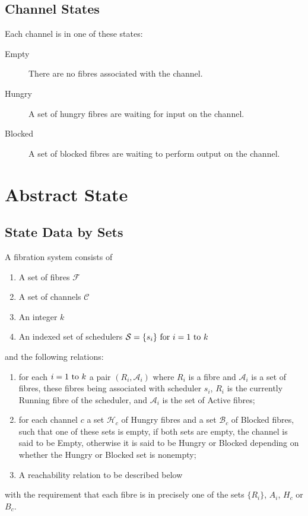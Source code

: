 \documentclass[oneside]{book}
\begin{document}
\subsection{Channel States}
Each channel is in one of these states:
\begin{description}
\item[Empty] There are no fibres associated with the channel.
\item[Hungry] A set of hungry fibres are waiting for input on the channel.
\item[Blocked] A set of blocked fibres are waiting to perform output on the channel.
\end{description}


\section{Abstract State}
\subsection{State Data by Sets}
A fibration system consists of 
\begin{enumerate}
\item A set of fibres $\mathcal F$
\item A set of channels $\mathcal C$
\item An integer $k$
\item An indexed set of schedulers $\mathcal S= \{s_i\}{\rm\ for\ }i=1 {\rm\ to\ }k$  
\end{enumerate}
and the following relations:
\begin{enumerate}
\item for each $i=1 {\rm\ to\ }k$ a pair $(R_i, \mathcal A_i)$ where $R_i$ is a fibre
and $\mathcal A_i$ is a set of fibres, these fibres being associated with
scheduler $s_i$, $R_i$ is the currently Running fibre of the scheduler,
and $\mathcal A_i$ is the set of Active fibres;
\item for each channel $c$ a set $\mathcal H_c$ of Hungry fibres
and a set $\mathcal B_c$ of Blocked fibres, such that one of these sets
is empty, if both sets are empty, the channel is said to be Empty,
otherwise it is said to be Hungry or Blocked depending on whether
the Hungry or Blocked set is nonempty;

\item A reachability relation to be described below
\end{enumerate}
with the requirement that each fibre is in precisely one of the sets $\{R_i\}$,
$A_i$, $H_c$ or $B_c$.
\end{document}
